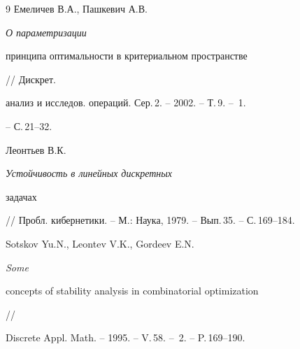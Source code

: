 \begin{thebibliography}{9}
 Емеличев В.А., Пашкевич А.В. {\em О параметризации


принципа оптимальности в критериальном пространстве} // Дискрет.


анализ и исследов. операций. Сер.\,2. -- 2002. -- Т.\,9. -- \No\,1.


-- С.\,21--32.





 Леонтьев В.К. {\em Устойчивость в линейных дискретных


задачах}


// Пробл. кибернетики. -- М.: Наука, 1979. -- Вып.\,35. -- С.\,169--184.





 Sotskov Yu.N., Leontev V.K., Gordeev E.N. {\em Some


concepts of stability analysis in combinatorial optimization} //


Discrete Appl. Math. -- 1995. -- V.\,58. -- \No\,2. -- P.\,169--190.





\end{thebibliography}





\vskip 0.5cm












\label{end}





